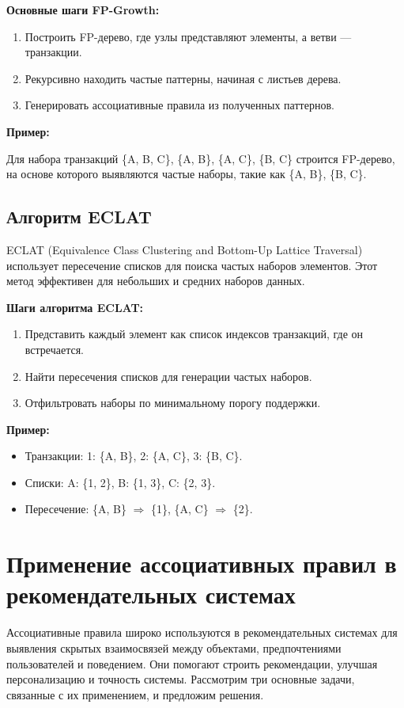 \textbf{Основные шаги FP-Growth:}
\begin{enumerate}
    \item Построить FP-дерево, где узлы представляют элементы, а ветви — транзакции.
    \item Рекурсивно находить частые паттерны, начиная с листьев дерева.
    \item Генерировать ассоциативные правила из полученных паттернов.
\end{enumerate}

\textbf{Пример:}

Для набора транзакций \{A, B, C\}, \{A, B\}, \{A, C\}, \{B, C\} строится FP-дерево, на основе которого выявляются частые наборы, такие как \{A, B\}, \{B, C\}.

\subsection{Алгоритм ECLAT}

ECLAT (Equivalence Class Clustering and Bottom-Up Lattice Traversal) использует пересечение списков для поиска частых наборов элементов. Этот метод эффективен для небольших и средних наборов данных.

\textbf{Шаги алгоритма ECLAT:}
\begin{enumerate}
    \item Представить каждый элемент как список индексов транзакций, где он встречается.
    \item Найти пересечения списков для генерации частых наборов.
    \item Отфильтровать наборы по минимальному порогу поддержки.
\end{enumerate}

\textbf{Пример:}

\begin{itemize}
    \item Транзакции: 1: \{A, B\}, 2: \{A, C\}, 3: \{B, C\}.
    \item Списки: A: \{1, 2\}, B: \{1, 3\}, C: \{2, 3\}.
    \item Пересечение: \{A, B\} $\Rightarrow$ \{1\}, \{A, C\} $\Rightarrow$ \{2\}.
\end{itemize}

\section{Применение ассоциативных правил в рекомендательных системах}

Ассоциативные правила широко используются в рекомендательных системах для выявления скрытых взаимосвязей между объектами, предпочтениями пользователей и поведением. Они помогают строить рекомендации, улучшая персонализацию и точность системы. Рассмотрим три основные задачи, связанные с их применением, и предложим решения.

